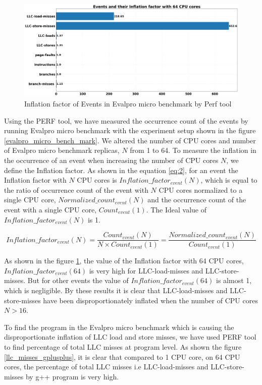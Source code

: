 \documentclass{iitbreport}
\begin{document}
\begin{figure}[!htb]
  \centering
  \includegraphics[width=\linewidth]{Images/perf_tool_results_final.png}
  \caption{Inflation factor of Events in Evalpro micro benchmark by Perf tool}
  \label{perf_results}
\end{figure}


 Using the PERF tool, we have measured the occurrence count of the events by running Evalpro micro benchmark with the experiment setup shown in the figure \ref{evalpro_micro_bench_mark}. We altered the number of CPU cores and number of Evalpro micro benchmark replicas, $N$ from 1 to 64. To measure the inflation in the occurrence of an event when increasing the number of CPU cores $N$, we define the Inflation factor. As shown in the equation \ref{eq:2}, for an event the Inflation factor with $N$ CPU cores is  $Inflation\_factor_{event}(N)$, which is equal to the ratio of occurrence count of the event with $N$ CPU cores normalized to a single CPU core, $Normalized\_count_{event}(N)$ and the occurrence count of the event  with a single CPU core, $Count_{event}(1)$. The Ideal value of $Inflation\_factor_{event}(N)$ is 1.

\begin{equation}
  Inflation\_factor_{event}(N)=\dfrac{Count_{event}(N)}{N \times Count_{event}(1)}=\dfrac{Normalized\_count_{event}(N)}{Count_{event}(1)}
  \label{eq:2}
\end{equation}

As shown in the figure \ref{perf_results}, the value of the  Inflation factor with 64 CPU cores, $Inflation\_factor_{event}(64)$ is very high for LLC-load-misses and LLC-store-misses. But  for other  events the value of $Inflation\_factor_{event}(64)$ is almost 1, which is negligible. By these results it is clear that LLC-load-misses and LLC-store-misses have been disproportionately inflated when the number of CPU cores $N>16$.

To find the  program in the Evalpro micro benchmark which is causing the  disproportionate inflation of LLC load and store misses, we have used PERF tool to find percentage of total LLC misses at program level. As shown the figure \ref{llc_misses_gplusplus}, it is clear that  compared to 1 CPU core, on 64 CPU cores, the percentage of total LLC misses i.e LLC-load-misses and LLC-store-misses by g++ program is very high. 
\end{document}
